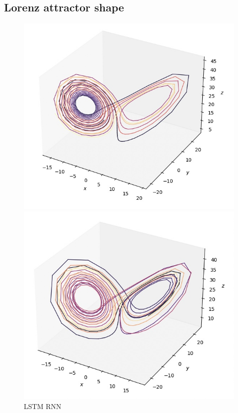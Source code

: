 \documentclass[11pt]{article}
\begin{document}
\subsection{Lorenz attractor shape}
\begin{figure}[ht]
    \centering
    \begin{minipage}{0.32\textwidth}
        \centering
        \includegraphics[width=\textwidth]{rnn_lorenz.jpeg}
        \caption{LSTM RNN}
        \label{fig:rnn_lorenz}
    \end{minipage}
    \hfill
    \begin{minipage}{0.32\textwidth}
        \centering
        \includegraphics[width=\textwidth]{echo_lorenz.jpeg}

\end{minipage}
\end{figure}
\end{document}
